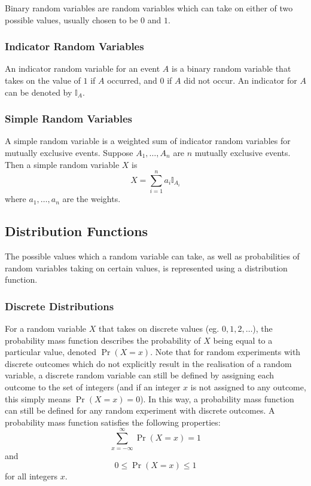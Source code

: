 \documentclass[11pt]{report} %
\begin{document}
Binary random variables are random variables which can take on either of two possible values, usually chosen to be $0$ and $1$.

\subsubsection{Indicator Random Variables}

An indicator random variable for an event $A$ is a binary random variable that takes on the value of $1$ if $A$ occurred, and $0$ if $A$ did not occur. An indicator for $A$ can be denoted by $\mathbb{I}_{A}$.

\subsubsection{Simple Random Variables}

A simple random variable is a weighted sum of indicator random variables for mutually exclusive events. Suppose $A_{1}, \dots, A_{n}$ are $n$ mutually exclusive events. Then a simple random variable $X$ is
\begin{equation}
X = \sum_{i = 1}^{n}a_{i}\mathbb{I}_{A_{i}}
\end{equation}
where $a_{1}, \dots, a_{n}$ are the weights.

\subsection{Distribution Functions}

The possible values which a random variable can take, as well as probabilities of random variables taking on certain values, is represented using a distribution function.

\subsubsection{Discrete Distributions}

For a random variable $X$ that takes on discrete values (eg. $0, 1, 2, \dots$), the probability mass function describes the probability of $X$ being equal to a particular value, denoted $\operatorname{Pr}\left(X = x\right)$. Note that for random experiments with discrete outcomes which do not explicitly result in the realisation of a random variable, a discrete random variable can still be defined by assigning each outcome to the set of integers (and if an integer $x$ is not assigned to any outcome, this simply means $\operatorname{Pr}\left(X = x\right) = 0$). In this way, a probability mass function can still be defined for any random experiment with discrete outcomes. A probability mass function satisfies the following properties:
\begin{equation}
\sum_{x=-\infty}^{\infty}\operatorname{Pr}\left(X = x\right) = 1
\end{equation}
and
\begin{equation}
0 \leq \operatorname{Pr}\left(X = x\right) \leq 1
\end{equation}
for all integers $x$.
\end{document}
